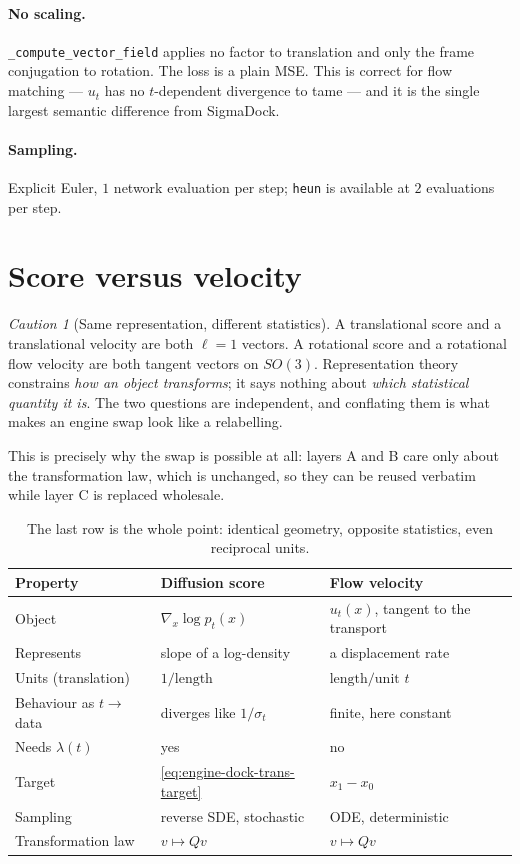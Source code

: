 \documentclass[11pt,a4paper]{report}
\theoremstyle{definition}
\theoremstyle{remark}
\newtheorem{caution}[caution]{Caution}
\newcommand{\pyfunc}[1]{\texttt{#1}}
\begin{document}
\paragraph{No scaling.} \pyfunc{\_compute\_vector\_field} applies no factor to
translation and only the frame conjugation to rotation. The loss is a plain
MSE. This is correct for flow matching --- $u_t$ has no $t$-dependent
divergence to tame --- and it is the single largest semantic difference from
SigmaDock.

\paragraph{Sampling.} Explicit Euler, $1$ network evaluation per step;
\texttt{heun} is available at $2$ evaluations per step.

\section{Score versus velocity}
\label{sec:engine-score-vs-velocity}

\begin{caution}[Same representation, different statistics]
\label{caution:same-rep-different-target}
A translational score and a translational velocity are both $\ell=1$ vectors.
A rotational score and a rotational flow velocity are both tangent vectors on
$SO(3)$. Representation theory constrains \emph{how an object transforms}; it
says nothing about \emph{which statistical quantity it is}. The two questions
are independent, and conflating them is what makes an engine swap look like a
relabelling.

This is precisely why the swap is possible at all: layers A and B care only
about the transformation law, which is unchanged, so they can be reused
verbatim while layer C is replaced wholesale.
\end{caution}

\begin{table}[htbp]
\centering
\begin{tabular}{lll}
\toprule
Property & Diffusion score & Flow velocity \\
\midrule
Object & $\nabla_x\log p_t(x)$ & $u_t(x)$, tangent to the transport \\
Represents & slope of a log-density & a displacement rate \\
Units (translation) & $1/\text{length}$ & $\text{length}/\text{unit }t$ \\
Behaviour as $t\to$ data & diverges like $1/\sigma_t$ & finite, here constant \\
Needs $\lambda(t)$ & yes & no \\
Target & \eqref{eq:engine-dock-trans-target} & $x_1-x_0$ \\
Sampling & reverse SDE, stochastic & ODE, deterministic \\
Transformation law & $v\mapsto Qv$ & $v\mapsto Qv$ \\
\bottomrule
\end{tabular}
\caption{The last row is the whole point: identical geometry, opposite
statistics, even reciprocal units.}
\label{tab:score-vs-velocity}
\end{table}
\end{document}
